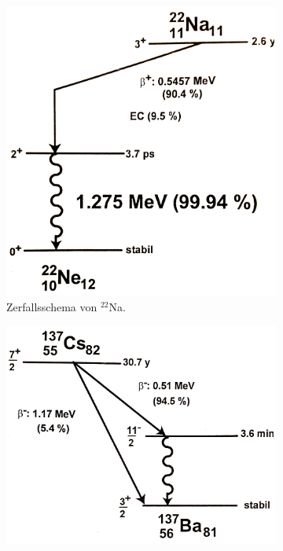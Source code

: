 \begin{figure}[H]
	\centering
	\begin{subfigure}[t]{0.45\textwidth}
		\centering
		\includegraphics[width=\textwidth]{img/ZerfallsschemaVonNa22}
		\caption{Zerfallsschema von $^{22}$Na.}
	\end{subfigure}
	\begin{subfigure}[t]{0.45\textwidth}
		\centering
		\includegraphics[width=\textwidth]{img/ZerfallsschemaVonCs137}

\end{subfigure}
\end{figure}
